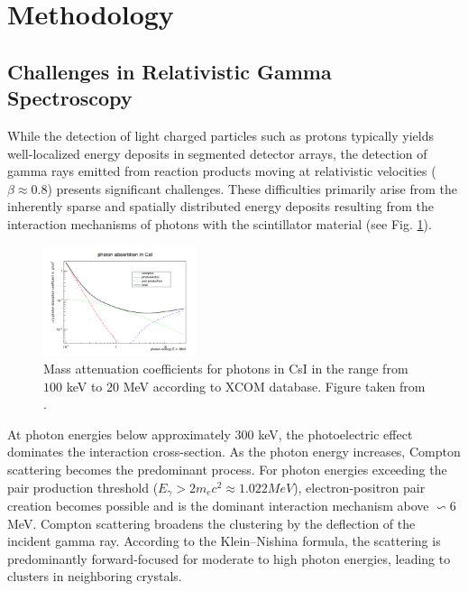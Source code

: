 \documentclass[final,5p,times,twocolumn]{elsarticle}
\begin{document}
\section{Methodology}
\label{sec:metho}
\subsection{Challenges in Relativistic Gamma Spectroscopy}\label{s_sec:gamma_spec}
While the detection of light charged particles such as protons typically yields well-localized energy deposits in segmented detector arrays, the detection of gamma rays emitted from reaction products moving at relativistic velocities ($\beta \approx 0.8$) presents significant challenges. These difficulties primarily arise from the inherently sparse and spatially distributed energy deposits resulting from the interaction mechanisms of photons with the scintillator material (see Fig. \ref{fig:csi}).\newline
\begin{figure}[!htb]
	\centering 
	\includegraphics[width=0.4\textwidth]{photon_absorbtion_csi.png}	
	\caption{Mass attenuation coefficients for photons in CsI in the range from $100$ keV to $20$ MeV according to XCOM database\cite{seltzer2010xcom}. Figure taken from \cite{klenze2024gamma}.} 
	\label{fig:csi}%
\end{figure}
At photon energies below approximately $300$ keV, the photoelectric effect dominates the interaction cross-section. As the photon energy increases, Compton scattering becomes the predominant process. For photon energies exceeding the pair production threshold ($E_{\gamma} > 2m_{e}c^2 \approx 1.022 MeV$), electron-positron pair creation becomes possible and is the dominant interaction mechanism above $\backsim 6$ MeV.\newline
Compton scattering broadens the clustering by the deflection of the incident gamma ray. According to the Klein–Nishina formula, the scattering is predominantly forward-focused for moderate to high photon energies\cite{klein1929streuung}, leading to clusters in neighboring crystals.\newline
\end{document}

